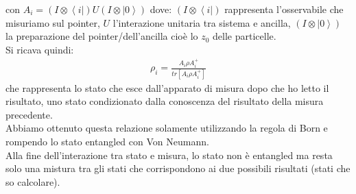 con $A_{i}=(I\otimes\left\langle i\right|)U(I\otimes\left|0\right\rangle)$ dove:
$(I\otimes\left\langle i\right|)$ rappresenta l'osservabile che misuriamo sul pointer, $U$ l'interazione unitaria tra sistema e ancilla, $(I\otimes\left|0\right\rangle)$ la preparazione del pointer/dell'ancilla cioè lo $z_{0}$ delle particelle. \\
Si ricava quindi:
\begin{equation}\begin{split}
\rho_{i}=\frac{A_{i}\rho A_{i}^+}{tr[A_{i}\rho A_{i}^+]}
\end{split}\end{equation}
che rappresenta lo stato che esce dall'apparato di misura dopo che ho letto il risultato, uno stato condizionato dalla conoscenza del risultato della misura precedente. \\
Abbiamo ottenuto questa relazione solamente utilizzando la regola di Born e rompendo lo stato entangled con Von Neumann.\\
Alla fine dell'interazione tra stato e misura, lo stato non è entangled ma resta solo una mistura tra gli stati che corrispondono ai due possibili risultati (stati che so calcolare).